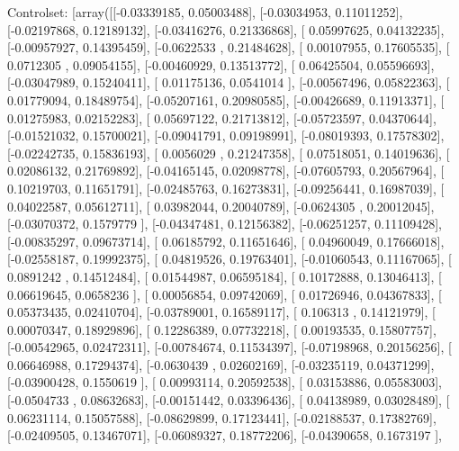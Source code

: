 \documentclass{article}
\begin{document}
Controlset: [array([[-0.03339185,  0.05003488],
       [-0.03034953,  0.11011252],
       [-0.02197868,  0.12189132],
       [-0.03416276,  0.21336868],
       [ 0.05997625,  0.04132235],
       [-0.00957927,  0.14395459],
       [-0.0622533 ,  0.21484628],
       [ 0.00107955,  0.17605535],
       [ 0.0712305 ,  0.09054155],
       [-0.00460929,  0.13513772],
       [ 0.06425504,  0.05596693],
       [-0.03047989,  0.15240411],
       [ 0.01175136,  0.0541014 ],
       [-0.00567496,  0.05822363],
       [ 0.01779094,  0.18489754],
       [-0.05207161,  0.20980585],
       [-0.00426689,  0.11913371],
       [ 0.01275983,  0.02152283],
       [ 0.05697122,  0.21713812],
       [-0.05723597,  0.04370644],
       [-0.01521032,  0.15700021],
       [-0.09041791,  0.09198991],
       [-0.08019393,  0.17578302],
       [-0.02242735,  0.15836193],
       [ 0.0056029 ,  0.21247358],
       [ 0.07518051,  0.14019636],
       [ 0.02086132,  0.21769892],
       [-0.04165145,  0.02098778],
       [-0.07605793,  0.20567964],
       [ 0.10219703,  0.11651791],
       [-0.02485763,  0.16273831],
       [-0.09256441,  0.16987039],
       [ 0.04022587,  0.05612711],
       [ 0.03982044,  0.20040789],
       [-0.0624305 ,  0.20012045],
       [-0.03070372,  0.1579779 ],
       [-0.04347481,  0.12156382],
       [-0.06251257,  0.11109428],
       [-0.00835297,  0.09673714],
       [ 0.06185792,  0.11651646],
       [ 0.04960049,  0.17666018],
       [-0.02558187,  0.19992375],
       [ 0.04819526,  0.19763401],
       [-0.01060543,  0.11167065],
       [ 0.0891242 ,  0.14512484],
       [ 0.01544987,  0.06595184],
       [ 0.10172888,  0.13046413],
       [ 0.06619645,  0.0658236 ],
       [ 0.00056854,  0.09742069],
       [ 0.01726946,  0.04367833],
       [ 0.05373435,  0.02410704],
       [-0.03789001,  0.16589117],
       [ 0.106313  ,  0.14121979],
       [ 0.00070347,  0.18929896],
       [ 0.12286389,  0.07732218],
       [ 0.00193535,  0.15807757],
       [-0.00542965,  0.02472311],
       [-0.00784674,  0.11534397],
       [-0.07198968,  0.20156256],
       [ 0.06646988,  0.17294374],
       [-0.0630439 ,  0.02602169],
       [-0.03235119,  0.04371299],
       [-0.03900428,  0.1550619 ],
       [ 0.00993114,  0.20592538],
       [ 0.03153886,  0.05583003],
       [-0.0504733 ,  0.08632683],
       [-0.00151442,  0.03396436],
       [ 0.04138989,  0.03028489],
       [ 0.06231114,  0.15057588],
       [-0.08629899,  0.17123441],
       [-0.02188537,  0.17382769],
       [-0.02409505,  0.13467071],
       [-0.06089327,  0.18772206],
       [-0.04390658,  0.1673197 ],
\end{document}
